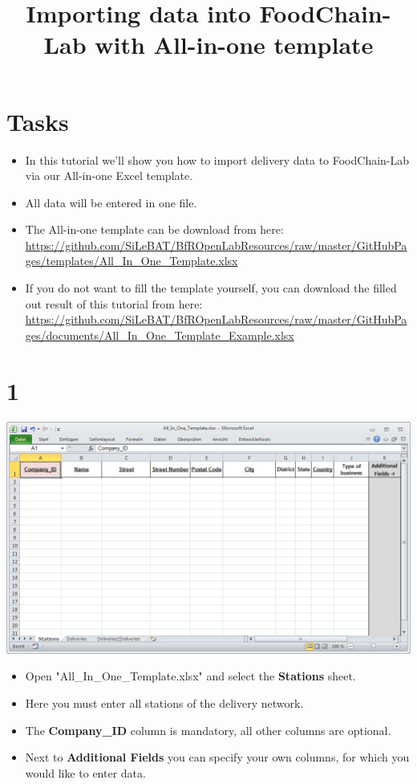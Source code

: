 \documentclass{beamer}
\title{Importing data into FoodChain-Lab with All-in-one template}
\date{}
\begin{document}
\maketitle

\section{Tasks}
\begin{frame}
	\begin{itemize}
		\item In this tutorial we'll show you how to import delivery data to FoodChain-Lab via our All-in-one Excel template.
		\item All data will be entered in one file.
		\item The All-in-one template can be download from here: \url{https://github.com/SiLeBAT/BfROpenLabResources/raw/master/GitHubPages/templates/All_In_One_Template.xlsx}
		\item If you do not want to fill the template yourself, you can download the filled out result of this tutorial from here: \url{https://github.com/SiLeBAT/BfROpenLabResources/raw/master/GitHubPages/documents/All_In_One_Template_Example.xlsx}
	\end{itemize}
\end{frame}
 
\section{1}
\begin{frame}
	\begin{center}
  		\includegraphics[height=0.5\textheight]{1.png}
	\end{center}
	\begin{itemize}
		\item Open "All\_In\_One\_Template.xlsx" and select the \textbf{Stations} sheet.
		\item Here you must enter all stations of the delivery network.
		\item The \textbf{Company\_ID} column is mandatory, all other columns are optional.
		\item Next to \textbf{Additional Fields} you can specify your own columns, for which you would like to enter data.
	\end{itemize}
\end{frame}
\end{document}
